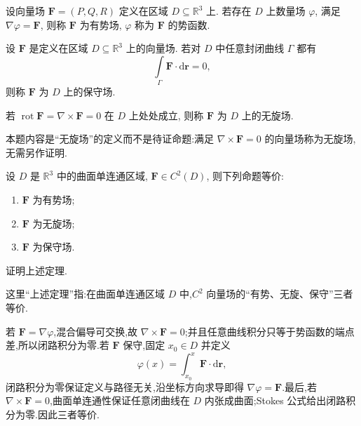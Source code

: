 \begin{definition}
    设向量场 $\bm F=(P,Q,R)$ 定义在区域 $D\subseteq\mathbb{R}^3$ 上. 若存在 $D$ 上数量场 $\varphi$, 满足 $\nabla\varphi=\bm F$, 则称 $\bm F$ 为有势场, $\varphi$ 称为 $\bm F$ 的势函数.
\end{definition}

\begin{definition}
    设 $\bm F$ 是定义在区域 $D\subseteq\mathbb{R}^3$ 上的向量场. 若对 $D$ 中任意封闭曲线 $\Gamma$ 都有
    \[
        \int\limits_\Gamma\bm F\cdot\mathrm{d}\bm r=0,
    \]
    则称 $\bm F$ 为 $D$ 上的保守场.
\end{definition}

\begin{example}
    若 $\operatorname{rot}\bm F=\nabla\times\bm F=0$ 在 $D$ 上处处成立, 则称 $\bm F$ 为 $D$ 上的无旋场.
\end{example}
\exampleblank

\begin{solution}
    本题内容是“无旋场”的定义而不是待证命题:满足 $\nabla\times\bm F=0$ 的向量场称为无旋场,无需另作证明.
\end{solution}

\begin{theorem}[\markstar]
    设 $D$ 是 $\mathbb{R}^3$ 中的曲面单连通区域, $\bm F\in C^2(D)$, 则下列命题等价:
    \begin{enumerate}
        \item $\bm F$ 为有势场;
        \item $\bm F$ 为无旋场;
        \item $\bm F$ 为保守场.
    \end{enumerate}
\end{theorem}

\begin{example}
    证明上述定理.
\end{example}
\exampleblank

\begin{solution}
    这里“上述定理”指:在曲面单连通区域 $D$ 中,$C^2$ 向量场的“有势、无旋、保守”三者等价.

    若 $\bm F=\nabla\varphi$,混合偏导可交换,故 $\nabla\times\bm F=0$;并且任意曲线积分只等于势函数的端点差,所以闭路积分为零.若 $\bm F$ 保守,固定 $x_0\in D$ 并定义
    \[
        \varphi(x)=\int_{x_0}^{x}\bm F\cdot\mathrm{d}\bm r,
    \]
    闭路积分为零保证定义与路径无关,沿坐标方向求导即得 $\nabla\varphi=\bm F$.最后,若 $\nabla\times\bm F=0$,曲面单连通性保证任意闭曲线在 $D$ 内张成曲面;Stokes 公式给出闭路积分为零.因此三者等价.
\end{solution}
